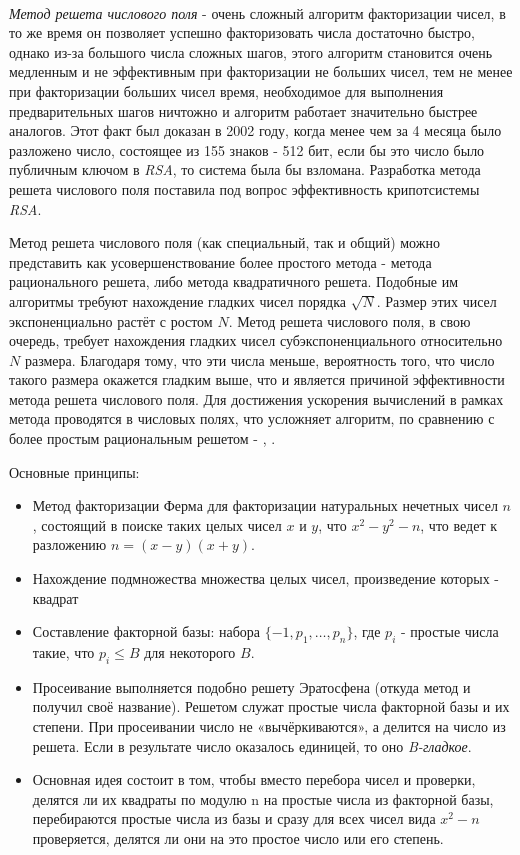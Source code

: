 \paragraph{} \textit{Метод решета числового поля} - очень сложный алгоритм факторизации чисел, в то же время он позволяет успешно факторизовать числа
  достаточно быстро, однако из-за большого числа сложных шагов, этого алгоритм становится очень медленным и не эффективным при факторизации
  не больших чисел, тем не менее при факторизации больших чисел время, необходимое для выполнения предварительных шагов ничтожно и алгоритм работает
  значительно быстрее аналогов. Этот факт был доказан в 2002 году, когда менее чем за 4 месяца было разложено число, состоящее из 155
  знаков - 512 бит, если бы это число было публичным ключом в \textit{RSA}, то система была бы взломана. Разработка метода решета числового поля 
  поставила под вопрос эффективность крипотсистемы \textit{RSA}.
  
  Метод решета числового поля (как специальный, так и общий) можно представить как усовершенствование более простого метода - метода 
  рационального решета, либо метода квадратичного решета. Подобные им алгоритмы требуют нахождение гладких чисел порядка {$\sqrt{N}$}. 
  Размер этих чисел экспоненциально растёт с ростом {$N$}. Метод решета числового поля, в свою очередь, требует нахождения гладких чисел 
  субэкспоненциального относительно {$N$} размера. Благодаря тому, что эти числа меньше, вероятность того, что число такого размера окажется гладким выше, что и 
  является причиной эффективности метода решета числового поля. Для достижения ускорения вычислений в рамках метода проводятся в числовых 
  полях, что усложняет алгоритм, по сравнению с более простым рациональным решетом - \cite[Глава 5, страницы 145-176]{ish11},
  \cite[Глава 6.4.2, страницы 222-225]{mah06}.
  
  Основные принципы:
    \begin{itemize}
     \item Метод факторизации Ферма для факторизации натуральных нечетных чисел {$n$}, состоящий в поиске таких целых чисел {$x$} и {$y$},
      что {$x^2-y^2-n$}, что ведет к разложению {$n=(x-y)(x+y)$}.
     \item Нахождение подмножества множества целых чисел, произведение которых - квадрат
     \item Составление факторной базы: набора {$\{-1, p_1, \dots, p_n \}$}, где {$p_i$} - простые числа такие, что {$p_i \le B$} 
      для некоторого {$B$}.
     \item Просеивание выполняется подобно решету Эратосфена (откуда метод и получил своё название). Решетом служат простые числа 
      факторной базы и их степени. При просеивании число не «вычёркиваются», а делится на число из решета. Если в результате число 
      оказалось единицей, то оно \textit{B-гладкое}.
     \item Основная идея состоит в том, чтобы вместо перебора чисел и проверки, делятся ли их квадраты по модулю n на простые числа из 
      факторной базы, перебираются простые числа из базы и сразу для всех чисел вида {$x^2-n$} проверяется, делятся ли они на это простое 
      число или его степень.
    \end{itemize}      
    
